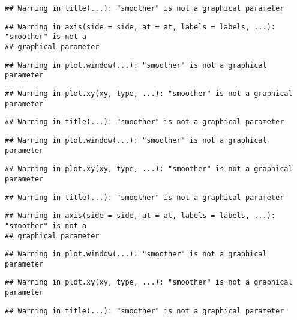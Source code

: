 \documentclass[
]{article}
\begin{document}
\begin{verbatim}
## Warning in title(...): "smoother" is not a graphical parameter
\end{verbatim}

\begin{verbatim}
## Warning in axis(side = side, at = at, labels = labels, ...): "smoother" is not a
## graphical parameter
\end{verbatim}

\begin{verbatim}
## Warning in plot.window(...): "smoother" is not a graphical parameter
\end{verbatim}

\begin{verbatim}
## Warning in plot.xy(xy, type, ...): "smoother" is not a graphical parameter
\end{verbatim}

\begin{verbatim}
## Warning in title(...): "smoother" is not a graphical parameter
\end{verbatim}

\begin{verbatim}
## Warning in plot.window(...): "smoother" is not a graphical parameter
\end{verbatim}

\begin{verbatim}
## Warning in plot.xy(xy, type, ...): "smoother" is not a graphical parameter
\end{verbatim}

\begin{verbatim}
## Warning in title(...): "smoother" is not a graphical parameter
\end{verbatim}

\begin{verbatim}
## Warning in axis(side = side, at = at, labels = labels, ...): "smoother" is not a
## graphical parameter
\end{verbatim}

\begin{verbatim}
## Warning in plot.window(...): "smoother" is not a graphical parameter
\end{verbatim}

\begin{verbatim}
## Warning in plot.xy(xy, type, ...): "smoother" is not a graphical parameter
\end{verbatim}

\begin{verbatim}
## Warning in title(...): "smoother" is not a graphical parameter
\end{verbatim}
\end{document}

